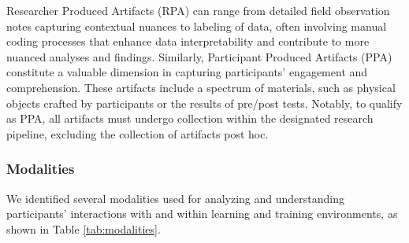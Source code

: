 \documentclass[manuscript,screen,review]{acmart}
\begin{document}
Researcher Produced Artifacts (RPA) can range from detailed field observation notes capturing contextual nuances to labeling of data, often involving manual coding processes that enhance data interpretability and contribute to more nuanced analyses and findings. Similarly, Participant Produced Artifacts (PPA) constitute a valuable dimension in capturing participants' engagement and comprehension. These artifacts include a spectrum of materials, such as physical objects crafted by participants or the results of pre/post tests. Notably, to qualify as PPA, all artifacts must undergo collection within the designated research pipeline, excluding the collection of artifacts post hoc. 

\subsubsection{Modalities} \label{sec:modalities}

We identified several modalities used for analyzing and understanding participants' interactions with and within learning and training environments, as shown in Table \ref{tab:modalities}. 
\end{document}
